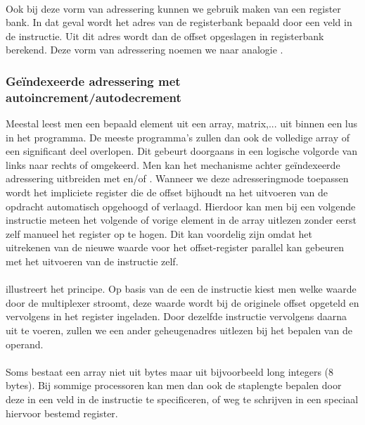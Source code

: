 \paragraph{}
Ook bij deze vorm van adressering kunnen we gebruik maken van een register bank. In dat geval wordt het adres van de registerbank bepaald door een veld in de instructie. Uit dit adres wordt dan de offset opgeslagen in registerbank berekend. Deze vorm van adressering noemen we naar analogie .
\subsubsection{Ge\"indexeerde adressering met autoincrement/autodecrement}
Meestal leest men een bepaald element uit een array, matrix,... uit binnen een lus in het programma. De meeste programma's zullen dan ook de volledige array of een significant deel overlopen. Dit gebeurt doorgaans in een logische volgorde van links naar rechts of omgekeerd. Men kan het mechanisme achter ge\"indexeerde adressering uitbreiden met  en/of . Wanneer we deze adresseringmode toepassen wordt het impliciete register die de offset bijhoudt na het uitvoeren van de opdracht automatisch opgehoogd of verlaagd. Hierdoor kan men bij een volgende instructie meteen het volgende of vorige element in de array uitlezen zonder eerst zelf manueel het register op te hogen. Dit kan voordelig zijn omdat het uitrekenen van de nieuwe waarde voor het offset-register parallel kan gebeuren met het uitvoeren van de instructie zelf.
\paragraph{}
 illustreert het principe. Op basis van de een de instructie kiest men welke waarde door de multiplexer stroomt, deze waarde wordt bij de originele offset opgeteld en vervolgens in het register ingeladen. Door dezelfde instructie vervolgens daarna uit te voeren, zullen we een ander geheugenadres uitlezen bij het bepalen van de operand.
\paragraph{}
Soms bestaat een array niet uit bytes maar uit bijvoorbeeld long integers (8 bytes). Bij sommige processoren kan men dan ook de staplengte bepalen door deze in een veld in de instructie te specificeren, of weg te schrijven in een speciaal hiervoor bestemd register.

